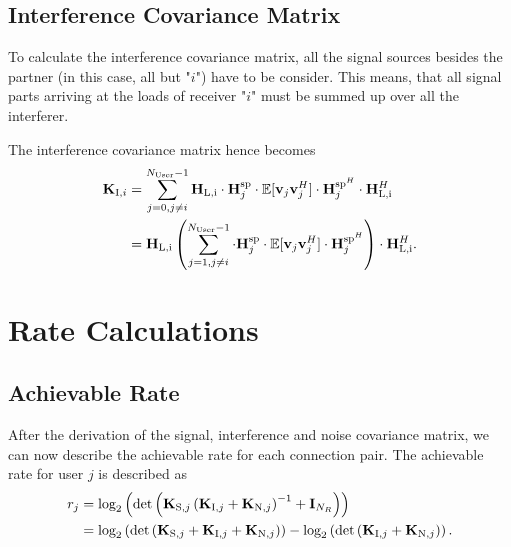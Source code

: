 \subsection{Interference Covariance Matrix}
\label{sec:int_cov}

To calculate the interference covariance matrix, all the signal sources besides the partner (in this case, all but "$i$") have to be consider.
This means, that all signal parts arriving at the loads of receiver "$i$" must be summed up over all the interferer.

The interference covariance matrix hence becomes 
\begin{align}
\label{eq:interf_cov}\nonumber
\mat{K}_{\text{I},i}%
 	&= \sum_{j=0,j\neq i}^{N_\text{User}-1} 
	\mat{H}_\text{L,i} \cdot \mat{H}_{j}^{\text{sp}} \cdot 
	\mathbb{E}[\vec{v}_{j}\vec{v}_{j}^H] \cdot 
	\mat{H}_{j}^{\text{sp}^H} \cdot \mat{H}_\text{L,i}^H\\
	&= \mat{H}_\text{L,i} \left(\sum_{j=1,j\neq i}^{N_\text{User}-1} 
	\cdot \mat{H}_{j}^{\text{sp}} \cdot 
	\mathbb{E}[\vec{v}_{j}\vec{v}_{j}^H] \cdot 
	\mat{H}_{j}^{\text{sp}^H}\right) \cdot \mat{H}_\text{L,i}^H.
\end{align}




\section{Rate Calculations}
\label{sec:rates}

\subsection{Achievable Rate}
\label{sec:achiev_rate}
After the derivation of the signal, interference and noise covariance matrix, we can now describe the achievable rate for each connection pair.
The achievable rate for user $j$ is described as
\begin{align}
\label{eq:achiev_rate}
\nonumber
r_j &= \text{log}_2\left(\text{det}\left(\mathbf{K}_{\text{S},j}\left(\mathbf{K}_{\text{I},j}+\mathbf{K}_{\text{N},j}\right)^{-1}+\mathbf{I}_{N_R}\right)\right)\\
 &=\text{log}_2\left(
	\text{det}\left(\mathbf{K}_{\text{S},j}+
		\mathbf{K}_{\text{I},j}+\mathbf{K}_{\text{N},j}\right)\right) -
	\text{log}_2\left(\text{det}\left(\mathbf{K}_{\text{I},j}+\mathbf{K}_{\text{N},j}\right)\right).
\end{align}

